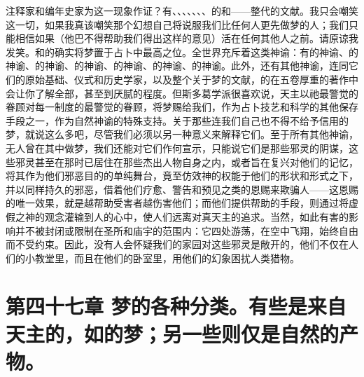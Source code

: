 注释家和编年史家为这一现象作证？有、、、、、、、的和——整代的文献。我只会嘲笑这一切，如果我真该嘲笑那个幻想自己将说服我们比任何人更先做梦的人；我们只能相信如果（他巴不得帮助我们得出这样的意见）活在任何其他人之前。请原谅我发笑。和的确实将梦置于占卜中最高之位。全世界充斥着这类神谕：有的神谕、的神谕、的神谕、的神谕、的神谕、的神谕、的神谕。此外，还有其他神谕，连同它们的原始基础、仪式和历史学家，以及整个关于梦的文献，的在五卷厚重的著作中会让你了解全部，甚至到厌腻的程度。但斯多葛学派很喜欢说，天主以祂最警觉的眷顾对每一制度的最警觉的眷顾，将梦赐给我们，作为占卜技艺和科学的其他保存手段之一，作为自然神谕的特殊支持。关于那些连我们自己也不得不给予信用的梦，就说这么多吧，尽管我们必须以另一种意义来解释它们。至于所有其他神谕，无人曾在其中做梦，我们还能对它们作何宣示，只能说它们是那些邪灵的阴谋，这些邪灵甚至在那时已居住在那些杰出人物自身之内，或者旨在复兴对他们的记忆，将其作为他们邪恶目的的单纯舞台，竟至仿效神的权能于他们的形状和形式之下，并以同样持久的邪恶，借着他们疗愈、警告和预见之类的恩赐来欺骗人——这恩赐的唯一效果，就是越帮助受害者越伤害他们；而他们提供帮助的手段，则通过将虚假之神的观念灌输到人的心中，使人们远离对真天主的追求。当然，如此有害的影响并不被封闭或限制在圣所和庙宇的范围内：它四处游荡，在空中飞翔，始终自由而不受约束。因此，没有人会怀疑我们的家园对这些邪灵是敞开的，他们不仅在人们的小教堂里，而且在他们的卧室里，用他们的幻象困扰人类猎物。\par


\section{第四十七章 梦的各种分类。有些是来自天主的，如的梦；另一些则仅是自然的产物。}

